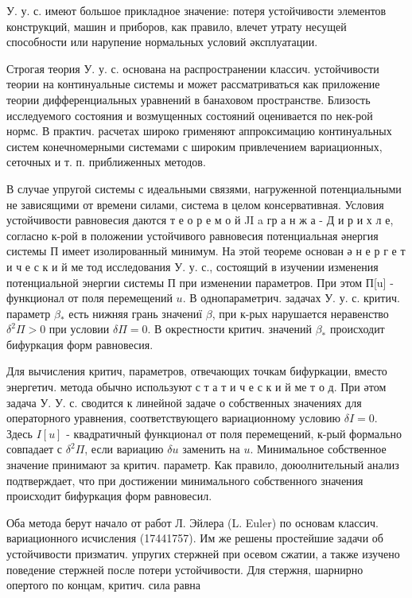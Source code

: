 \documentclass[10pt]{article}
\begin{document}
У. у. с. имеют большое прикладное значение: потеря устойчивости элементов конструкций, машин и приборов, как правило, влечет утрату несущей способности или нарупение нормальных условий әксплуатации.



Строгая теория У. у. с. основана на распространении классич. устойчивости теории на континуальные системы и может рассматриваться как приложение теории дифференциальных уравнений в банаховом пространстве. Близость исследуемого состояния и возмущенных состояний оценивается по нек-рой нормс. В практич. расчетах широко грименяют аппроксимацию континуальных систем конечномерными системами с широким привлечением вариационных, сеточных и т. п. приближенных методов.



В случае упругой системы с идеальными связями, нагруженной потенциальными не зависящими от времени силами, система в целом консервативная. Условия устойчивости равновесия даются т е о р е м о й JI a гр а н ж а - Д и р и х л е, согласно к-рой в положении устойчивого равновесия потенциальная әнергия системы П имеет изолированный минимум. На этой теореме основан ә н е р г е т и ч е с к и й ме тод исследования У. у. с., состоящий в изучении изменения потенциальной энергии системы П при изменении параметров. При этом П[u] - функционал от поля перемещений $u$. В однопараметрич. задачах У. у. с. критич. параметр $\beta_{*}$ есть нижняя грань значениї $\beta$, при к-рых нарушается неравенство $\delta^{2} \Pi>0$ при условии $\delta \Pi=0$. В окрестности критич. значений $\beta_{*}$ происходит бифуркация форм равновесия.



Для вычисления критич, параметров, отвечающих точкам бифуркации, вместо энергетич. метода обычно используют с т а т и ч е с к и й ме т о д. При әтом задача У. У. с. сводится к линейной задаче о собственных значениях для операторного уравнения, соответствующего вариационному условию $\delta I=0$. Здесь $I[u]$ - квадратичный функционал от поля перемещений, к-рый формально совпадает с $\delta^{2} \Pi$, если вариацию $\delta u$ заменить на $u$. Минимальное собственное значение принимают за критич. параметр. Как правило, доюолнительный анализ подтверждает, что при достижении минимального собственного значения происходит бифуркация форм равновесил.



Оба метода берут начало от работ Л. Эйлера (L. Euler) по основам классич. вариационного исчисления (17441757). Им же решены простейшие задачи об устойчивости призматич. упругих стержней при осевом сжатии, а также изучено поведение стержней после потери устойчивости. Для стержня, шарнирно опертого по концам, критич. сила равна
\end{document}
